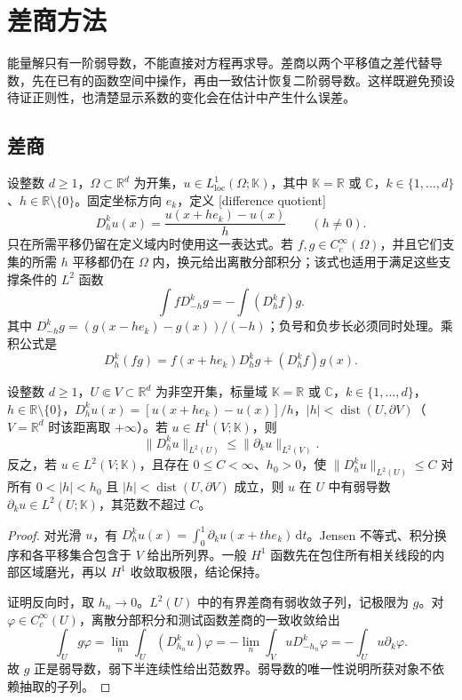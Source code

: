 \section{差商方法}
\label{b2:sec:1601}

能量解只有一阶弱导数，不能直接对方程再求导。差商以两个平移值之差代替导数，先在已有的函数空间中操作，再由一致估计恢复二阶弱导数。这样既避免预设待证正则性，也清楚显示系数的变化会在估计中产生什么误差。

\subsection{差商}
\label{b2:subsec:160101}

设整数 \(d\geq1\)，\(\Omega\subset\mathbb R^d\) 为开集，\(u\in L^1_{\mathrm{loc}}(\Omega;\mathbb K)\)，其中 \(\mathbb K=\mathbb R\) 或 \(\mathbb C\)，\(k\in\{1,\ldots,d\}\)、\(h\in\mathbb R\setminus\{0\}\)。固定坐标方向 \(e_k\)，定义 [difference quotient]
\[D_h^ku(x)=\frac{u(x+he_k)-u(x)}h\qquad(h\ne0).\]
只在所需平移仍留在定义域内时使用这一表达式。若 \(f,g\in C_c^\infty(\Omega)\)，并且它们支集的所需 \(h\) 平移都仍在 \(\Omega\) 内，换元给出离散分部积分；该式也适用于满足这些支撑条件的 \(L^2\) 函数
\[\int fD_{-h}^kg=-\int(D_h^kf)g.\]
其中 \(D_{-h}^kg=(g(x-he_k)-g(x))/(-h)\)；负号和负步长必须同时处理。乘积公式是
\[D_h^k(fg)=f(x+he_k)D_h^kg+(D_h^kf)g(x).\]

\begin{lemma}[差商与弱导数]
\label{b2:lem:16-difference-quotient}
设整数 \(d\geq1\)，\(U\Subset V\subset\mathbb R^d\) 为非空开集，标量域 \(\mathbb K=\mathbb R\) 或 \(\mathbb C\)，\(k\in\{1,\ldots,d\}\)，\(h\in\mathbb R\setminus\{0\}\)，\(D_h^ku(x)=[u(x+he_k)-u(x)]/h\)，\(|h|<\operatorname{dist}(U,\partial V)\)（\(V=\mathbb R^d\) 时该距离取 \(+\infty\)）。若 \(u\in H^1(V;\mathbb K)\)，则
\[\lVert D_h^ku\rVert_{L^2(U)}\le\lVert\partial_ku\rVert_{L^2(V)}.\]
反之，若 \(u\in L^2(V;\mathbb K)\)，且存在 \(0\leq C<\infty\)、\(h_0>0\)，使 \(\lVert D_h^ku\rVert_{L^2(U)}\le C\) 对所有 \(0<|h|<h_0\) 且 \(|h|<\operatorname{dist}(U,\partial V)\) 成立，则 \(u\) 在 \(U\) 中有弱导数 \(\partial_ku\in L^2(U;\mathbb K)\)，其范数不超过 \(C\)。
\end{lemma}
\begin{proof}
对光滑 \(u\)，有 \(D_h^ku(x)=\int_0^1\partial_ku(x+the_k)\,\mathrm dt\)。Jensen 不等式、积分换序和各平移集合包含于 \(V\) 给出所列界。一般 \(H^1\) 函数先在包住所有相关线段的内部区域磨光，再以 \(H^1\) 收敛取极限，结论保持。

证明反向时，取 \(h_n\to0\)。\(L^2(U)\) 中的有界差商有弱收敛子列，记极限为 \(g\)。对 \(\varphi\in C_c^\infty(U)\)，离散分部积分和测试函数差商的一致收敛给出
\[\int_Ug\varphi=\lim_n\int_U(D_{h_n}^ku)\varphi
 =-\lim_n\int_VuD_{-h_n}^k\varphi=-\int_Uu\partial_k\varphi.\]
故 \(g\) 正是弱导数，弱下半连续性给出范数界。弱导数的唯一性说明所获对象不依赖抽取的子列。
\end{proof}

